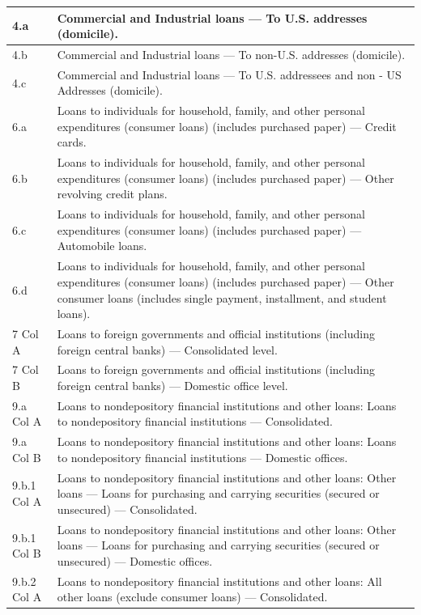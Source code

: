 \documentclass[conference]{IEEEtran}
\begin{document}
\begin{table}[htbp]
\begin{tabular}{|p{3cm}|p{12cm}|}
		\hline
		4.a & Commercial and Industrial loans — To U.S. addresses (domicile). \\
		\hline
		4.b & Commercial and Industrial loans — To non-U.S. addresses (domicile). \\
		\hline
		4.c & Commercial and Industrial loans — To U.S. addressees and non - US Addresses (domicile). \\
		\hline
		6.a & Loans to individuals for household, family, and other personal expenditures (consumer loans) (includes purchased paper) — Credit cards. \\
		\hline
		6.b & Loans to individuals for household, family, and other personal expenditures (consumer loans) (includes purchased paper) — Other revolving credit plans. \\
		\hline
		6.c & Loans to individuals for household, family, and other personal expenditures (consumer loans) (includes purchased paper) — Automobile loans. \\
		\hline
		6.d & Loans to individuals for household, family, and other personal expenditures (consumer loans) (includes purchased paper) — Other consumer loans (includes single payment, installment, and student loans). \\
		\hline
		7 Col A & Loans to foreign governments and official institutions (including foreign central banks) — Consolidated level. \\
		\hline
		7 Col B & Loans to foreign governments and official institutions (including foreign central banks) — Domestic office level. \\
		\hline
		9.a Col A & Loans to nondepository financial institutions and other loans: Loans to nondepository financial institutions — Consolidated. \\
		\hline
		9.a Col B & Loans to nondepository financial institutions and other loans: Loans to nondepository financial institutions — Domestic offices. \\
		\hline
		9.b.1 Col A & Loans to nondepository financial institutions and other loans: Other loans — Loans for purchasing and carrying securities (secured or unsecured) — Consolidated. \\
		\hline
		9.b.1 Col B & Loans to nondepository financial institutions and other loans: Other loans — Loans for purchasing and carrying securities (secured or unsecured) — Domestic offices. \\
		\hline
		9.b.2 Col A & Loans to nondepository financial institutions and other loans: All other loans (exclude consumer loans) — Consolidated. \\

\end{tabular}
\end{table}
\end{document}
